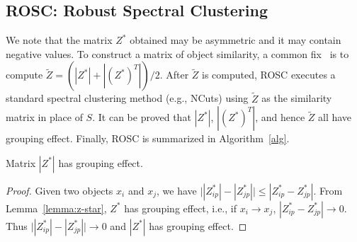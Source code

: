 \subsection*{ROSC: Robust Spectral Clustering}

We note that the matrix $Z^*$ obtained may be asymmetric and it may contain negative values.
To construct a matrix of object similarity, a common fix~\cite{liu2013robust,lu2012robust} is to 
compute $\tilde{Z} = (|Z^*|+|(Z^*)^T|)/2$.
After $\tilde{Z}$ is computed, ROSC executes a standard spectral clustering method
(e.g., NCuts) using $\tilde{Z}$ as the similarity matrix in place of $S$.
It can be proved that $|Z^*|$, $|(Z^*)^T|$, and hence $\tilde{Z}$ all have grouping effect.
Finally, ROSC is summarized in Algorithm~\ref{alg}.


\begin{lemma}
Matrix $|Z^*|$ has grouping effect.
\label{lemma:z-star-abs}
\end{lemma}
\begin{proof}
Given two objects $x_i$ and $x_j$,
we have 
$\bigl||Z_{ip}^*|-|Z_{jp}^*|\bigr| \leq |Z_{ip}^*-Z_{jp}^*|$.
From Lemma~\ref{lemma:z-star},
$Z^*$ has grouping effect, i.e.,
if $x_i \rightarrow x_j$, $|Z_{ip}^*-Z_{jp}^*| \rightarrow 0$.
Thus $\bigl||Z_{ip}^*|-|Z_{jp}^*|\bigr| \rightarrow 0$ and 
$|Z^*|$ has grouping effect.
\end{proof}


